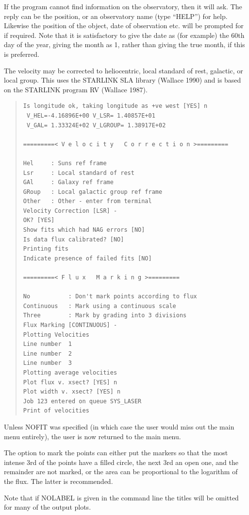 \documentclass[11pt,twoside]{article}
\begin{document}
If the program cannot find information on the observatory, then it will
ask.
The reply can be the position, or an observatory name (type
``HELP'') for help.
Likewise the position of the object, date of observation etc. will be
prompted for if required.
Note that it is satisfactory to give the date as (for example) the 60th
day of the year, giving the month as 1, rather than giving the true
month, if this is preferred.

The velocity may be corrected to heliocentric, local standard of rest,
galactic, or local group.
This uses the STARLINK SLA library (Wallace 1990) and is based on the
STARLINK program RV (Wallace 1987).

\begin{quote}\begin{verbatim}
Is longitude ok, taking longitude as +ve west [YES] n
 V_HEL=-4.16896E+00 V_LSR= 1.40857E+01
 V_GAL= 1.33324E+02 V_LGROUP= 1.38917E+02

=========< V e l o c i t y   C o r r e c t i o n >=========

Hel     : Suns ref frame
Lsr     : Local standard of rest
GAl     : Galaxy ref frame
GRoup   : Local galactic group ref frame
Other   : Other - enter from terminal
Velocity Correction [LSR] -
OK? [YES]
Show fits which had NAG errors [NO]
Is data flux calibrated? [NO]
Printing fits
Indicate presence of failed fits [NO]

=========< F l u x   M a r k i n g >=========

No           : Don't mark points according to flux
Continuous   : Mark using a continuous scale
Three        : Mark by grading into 3 divisions
Flux Marking [CONTINUOUS] -
Plotting Velocities
Line number  1
Line number  2
Line number  3
Plotting average velocities
Plot flux v. xsect? [YES] n
Plot width v. xsect? [YES] n
Job 123 entered on queue SYS_LASER
Print of velocities
\end{verbatim}\end{quote}

Unless NOFIT was specified (in which case the user would miss out
the main menu entirely), the user is now returned to the main menu.

The option to mark the points can either put the markers so that the
most intense 3rd of the points have a filled circle, the next 3rd an
open one, and the remainder are not marked, or the area can be
proportional to the logarithm of the flux.
The latter is recommended.

Note that if NOLABEL is given in the command line the titles will be
omitted for many of the output plots.
\end{document}
